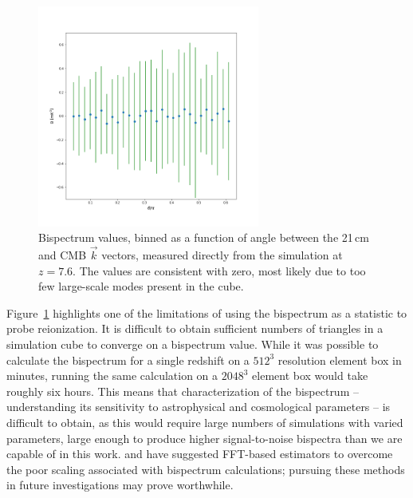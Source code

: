\begin{figure}
\centering
\includegraphics[width=0.65\textwidth]{chapters/ksz_21cm/figures/analytic_bispec_decimate1.png}
\caption[Bispectrum values, binned as a function of angle between the 21\,cm and CMB $\vec{k}$ vectors, measured directly from the simulation.]{Bispectrum values, binned as a function of angle between the 21\,cm and CMB $\vec{k}$ vectors, measured directly from the simulation at $z=7.6$. The values are consistent with zero, most likely due to too few large-scale modes present in the cube.}
\label{fig:ksz_21cm_direct_bispectrum}
\end{figure}


Figure~\ref{fig:ksz_21cm_direct_bispectrum} highlights one of the limitations of using the bispectrum as a statistic to probe reionization. It is difficult to obtain sufficient numbers of triangles in a simulation cube to converge on a bispectrum value. While it was possible to calculate the bispectrum for a single redshift on a $512^3$ resolution element box in minutes, running the same calculation on a $2048^3$ element box would take roughly six hours. This means that characterization of the bispectrum -- understanding its sensitivity to astrophysical and cosmological parameters -- is difficult to obtain, as this would require large numbers of simulations with varied parameters, large enough to produce higher signal-to-noise bispectra than we are capable of in this work. \cite{Sefusatti.16} and \cite{Watkinson.17} have suggested FFT-based estimators to overcome the poor scaling associated with bispectrum calculations; pursuing these methods in future investigations may prove worthwhile.

